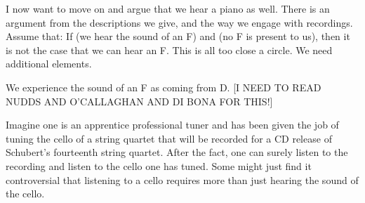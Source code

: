 \documentclass[sloppy, journal, git, bytitle, dodraft]{humapap}
\begin{document}



\sect I now want to move on and argue that we hear a piano as well. 
There is an argument from the descriptions we give, and the way we engage with recordings.
Assume that: If (we hear the sound of an F) and (no F is present to us), then it is not the case that we can hear an F. This is all too close a circle. We need additional elements. 

We experience the sound of an F as coming from D. [I NEED TO READ NUDDS AND O'CALLAGHAN AND DI BONA FOR THIS!] 

Imagine one is an apprentice professional tuner and has been given the job of tuning the cello of a string quartet that will be recorded for a CD release of Schubert's fourteenth string quartet. After the fact, one can surely listen to the recording and listen to the cello one has tuned. Some might just find it controversial that listening to a cello requires more than just hearing the sound of the cello.
\end{document}
